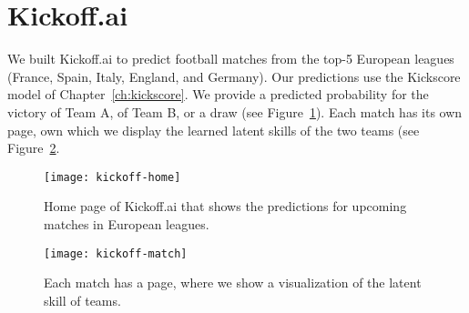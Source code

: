 \section{Kickoff.ai}
\label{app:kks:kickoffai}

We built Kickoff.ai to predict football matches from the top-5 European leagues (France, Spain, Italy, England, and Germany).
Our predictions use the Kickscore model of Chapter~\ref{ch:kickscore}.
We provide a predicted probability for the victory of Team A, of Team B, or a draw (see Figure~\ref{app:fig:kickoff-home}).
Each match has its own page, own which we display the learned latent skills of the two teams (see Figure~\ref{app:fig:kickoff-match}.

\begin{figure}
	\centering
	\texttt{[image: kickoff-home]}
	\caption{Home page of Kickoff.ai that shows the predictions for upcoming matches in European leagues.}
	\label{app:fig:kickoff-home}
\end{figure}

\begin{figure}
	\centering
	\texttt{[image: kickoff-match]}
	\caption{Each match has a page, where we show a visualization of the latent skill of teams.}
	\label{app:fig:kickoff-match}
\end{figure}
